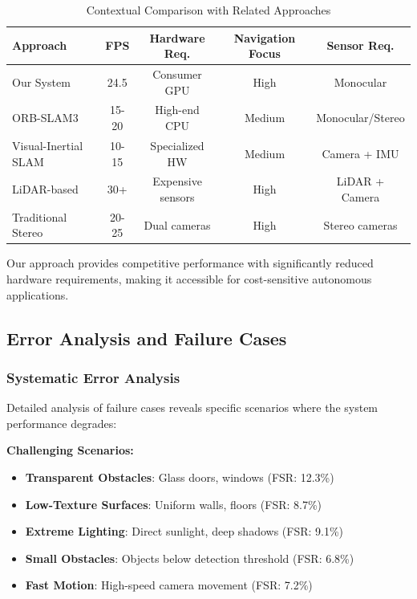 \documentclass[10pt]{article}
\begin{document}
\begin{table}[ht]
\centering
\caption{Contextual Comparison with Related Approaches}
\label{tab:sota_comparison}
\begin{tabular}{@{}lcccc@{}}
\toprule
\textbf{Approach} & \textbf{FPS} & \textbf{Hardware Req.} & \textbf{Navigation Focus} & \textbf{Sensor Req.} \\
\midrule
Our System & 24.5 & Consumer GPU & High & Monocular \\
ORB-SLAM3 & 15-20 & High-end CPU & Medium & Monocular/Stereo \\
Visual-Inertial SLAM & 10-15 & Specialized HW & Medium & Camera + IMU \\
LiDAR-based & 30+ & Expensive sensors & High & LiDAR + Camera \\
Traditional Stereo & 20-25 & Dual cameras & High & Stereo cameras \\
\bottomrule
\end{tabular}
\end{table}

Our approach provides competitive performance with significantly reduced hardware requirements, making it accessible for cost-sensitive autonomous applications.

\subsection{Error Analysis and Failure Cases}

\subsubsection{Systematic Error Analysis}

Detailed analysis of failure cases reveals specific scenarios where the system performance degrades:

\textbf{Challenging Scenarios:}
\begin{itemize}
\item \textbf{Transparent Obstacles}: Glass doors, windows (FSR: 12.3\%)
\item \textbf{Low-Texture Surfaces}: Uniform walls, floors (FSR: 8.7\%)
\item \textbf{Extreme Lighting}: Direct sunlight, deep shadows (FSR: 9.1\%)
\item \textbf{Small Obstacles}: Objects below detection threshold (FSR: 6.8\%)
\item \textbf{Fast Motion}: High-speed camera movement (FSR: 7.2\%)
\end{itemize}
\end{document}
